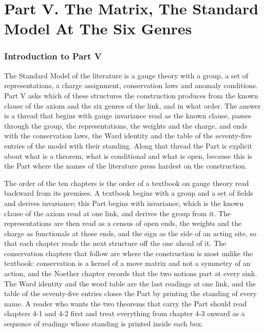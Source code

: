 \clearpage
\part*{Part V. The Matrix, The Standard Model At The Six Genres}
\label{atlaspart:05-gauge-structure}
\section*{Introduction to Part V}\label{narr:part:IV}
The Standard Model of the literature is a gauge theory with a group, a set of representations, a charge assignment, conservation laws and anomaly conditions. Part V asks which of these structures the construction produces from the known clause of the axiom and the six genres of the link, and in what order. The answer is a thread that begins with gauge invariance read as the known clause, passes through the group, the representations, the weights and the charge, and ends with the conservation laws, the Ward identity and the table of the seventy-five entries of the model with their standing. Along that thread the Part is explicit about what is a theorem, what is conditional and what is open, because this is the Part where the names of the literature press hardest on the construction.

The order of the ten chapters is the order of a textbook on gauge theory read backward from its premises. A textbook begins with a group and a set of fields and derives invariance; this Part begins with invariance, which is the known clause of the axiom read at one link, and derives the group from it. The representations are then read as a census of open ends, the weights and the charge as functionals at those ends, and the sign as the side of an acting site, so that each chapter reads the next structure off the one ahead of it. The conservation chapters that follow are where the construction is most unlike the textbook: conservation is a kernel of a move matrix and not a symmetry of an action, and the Noether chapter records that the two notions part at every sink. The Ward identity and the word table are the last readings at one link, and the table of the seventy-five entries closes the Part by printing the standing of every name. A reader who wants the two theorems that carry the Part should read chapters 4-1 and 4-2 first and treat everything from chapter 4-3 onward as a sequence of readings whose standing is printed inside each box.

